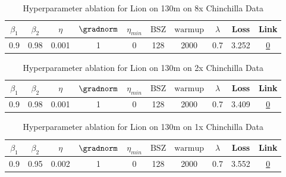 \begin{table}[H]
\centering
\caption{Hyperparameter ablation for Lion on 130m on 8x Chinchilla Data}
\label{tab:ablation_lion_130m_8}
\begin{tabular}{cccccccccc}
\toprule
$\beta_1$ & $\beta_2$ & $\eta$ & $\gradnorm$ & $\eta_{min}$ & $\mathrm{BSZ}$ & $\mathrm{warmup}$ & $\lambda$ & Loss & Link \\
\midrule
0.9 & 0.98 & 0.001 & 1 & 0 & 128 & 2000 & 0.7 & 3.252 & \href{https://wandb.ai/stanford-mercury/optimizer-scaling/runs/sweep-130m-21B-lion85b813lr0.001-wd0.7-minlr0-warmup2000-b10.9-b-eef545}{0} \\
\midrule
\bottomrule
\end{tabular}
\end{table}

\begin{table}[H]
\centering
\caption{Hyperparameter ablation for Lion on 130m on 2x Chinchilla Data}
\label{tab:ablation_lion_130m_2}
\begin{tabular}{cccccccccc}
\toprule
$\beta_1$ & $\beta_2$ & $\eta$ & $\gradnorm$ & $\eta_{min}$ & $\mathrm{BSZ}$ & $\mathrm{warmup}$ & $\lambda$ & Loss & Link \\
\midrule
0.9 & 0.98 & 0.001 & 1 & 0 & 128 & 2000 & 0.7 & 3.409 & \href{https://wandb.ai/stanford-mercury/optimizer-scaling/runs/sweep-130m-5B-lion5d07e9lr0.001-wd0.7-minlr0-warmup2000-b10.9-b2-6d65d0}{0} \\
\midrule
\bottomrule
\end{tabular}
\end{table}

\begin{table}[H]
\centering
\caption{Hyperparameter ablation for Lion on 130m on 1x Chinchilla Data}
\label{tab:ablation_lion_130m_1}
\begin{tabular}{cccccccccc}
\toprule
$\beta_1$ & $\beta_2$ & $\eta$ & $\gradnorm$ & $\eta_{min}$ & $\mathrm{BSZ}$ & $\mathrm{warmup}$ & $\lambda$ & Loss & Link \\
\midrule
0.9 & 0.95 & 0.002 & 1 & 0 & 128 & 2000 & 0.7 & 3.552 & \href{https://wandb.ai/stanford-mercury/optimizer-scaling/runs/sweep-130m-2B-lion3532d0lr0.002-wd0.7-minlr0-warmup2000-b10.9-b2-2f88e4}{0} \\
\midrule
\bottomrule
\end{tabular}
\end{table}


